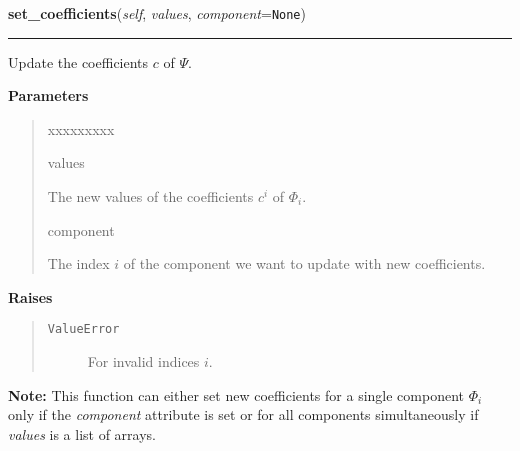     \vspace{0.5ex}

\hspace{.8\funcindent}\begin{boxedminipage}{\funcwidth}

    \raggedright \textbf{set\_coefficients}(\textit{self}, \textit{values}, \textit{component}={\tt None})

    \vspace{-1.5ex}

    \rule{\textwidth}{0.5\fboxrule}
\setlength{\parskip}{2ex}
    Update the coefficients $c$ of $\Psi$.

\setlength{\parskip}{1ex}
      \textbf{Parameters}
      \vspace{-1ex}

      \begin{quote}
        \begin{Ventry}{xxxxxxxxx}

          \item[values]

          The new values of the coefficients $c^i$ of
          $\Phi_i$.

          \item[component]

          The index $i$ of the component we want to update with new
          coefficients.

        \end{Ventry}

      \end{quote}

      \textbf{Raises}
    \vspace{-1ex}

      \begin{quote}
        \begin{description}

          \item[\texttt{ValueError}]

          For invalid indices $i$.

        \end{description}

      \end{quote}

\textbf{Note:} This function can either set new coefficients for a single component
$\Phi_i$ only if the \textit{component} attribute is set
or for all components simultaneously if \textit{values} is a list of
arrays.



    \end{boxedminipage}

